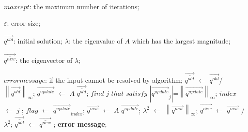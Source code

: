 \documentclass[12pt,a4paper,UTF8]{ctexart}
\begin{document}
\begin{enumerate}
\begin{algorithm}[H]
\begin{algorithmic}[1]
                  $maxrept$: the maximum number of iterations;

                  $\varepsilon $: error size;

                  $\overrightarrow{q^{old}} $: initial solution;
                  \Ensure
                  $\lambda$: the eigenvalue of $A$ which has the largest magnitude;

                  $\overrightarrow{\overline{q^{new}} }$: the eigenvector of $\lambda$;

                  $error message$: if the input cannot be resolved by algorithm;
                  \State $\overrightarrow{\overline{q^{old}}}$ $\leftarrow$ ${\overrightarrow{q^{old}}}$/${\left\lVert \overrightarrow{q^{old}}\right\rVert_{\infty} }$;
                  \State$\overrightarrow{q^{update}} $ $\leftarrow$ $A$ $\overrightarrow{\overline{q^{old}}}$;
                  \State$find$ $j$ $that$ $satisfy$ $\left\lvert\overrightarrow{q^{update}}_{j} \right\rvert $=${\left\lVert \overrightarrow{q^{update}}\right\rVert_{\infty} }$;
                  \State$index$ $\leftarrow$ $j$ ;
                  \State$flag$ $\leftarrow$ $\overrightarrow{q^{update}}_{index}$;
                  \State$\overrightarrow{q^{new}}$ $\leftarrow$ $A$ $\overrightarrow{q^{update}}$;
                  \State$\lambda^{2}$ $\leftarrow$ ${\left\lVert \overrightarrow{q^{new}}\right\rVert_{\infty} }$;
                  \State$\overrightarrow{\overline{q^{new}} }$ $\leftarrow$ $\overrightarrow{q^{new}}$ / $\lambda^{2}$;
                  \State{}
                  \State{}
                  \Else
                  \State$\overrightarrow{\overline{q^{old}}}$ $\leftarrow$ $\overrightarrow{\overline{q^{new}}}$ ;
                  \EndIf
                  \EndFor
                  \State \textbf{error message};
              \end{algorithmic}
          \end{algorithm}

\end{enumerate}
\end{document}
